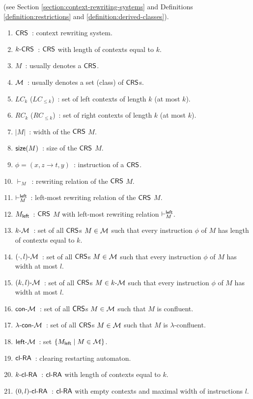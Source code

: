  (see Section \ref{section:context-rewriting-systems} and Definitions \ref{definition:restrictions} and \ref{definition:derived-classes}).

\begin{enumerate}[]
\item $\textup{\sf CRS\/}$\ : context rewriting system.
\item $\textup{\sf $k$-\textup{\sf CRS\/}}$\ : $\textup{\sf CRS\/}$ with length of contexts equal to $k$.
\item $M$\ : usually denotes a $\textup{\sf CRS\/}$.
\item $\textup{\sf $\mathcal{M}$}$\ : usually denotes a set (class) of $\textup{\sf CRS\/}$s.
\item $LC_k$ ($LC_{\le k}$)\ : set of left contexts of length $k$ (at most $k$).
\item $RC_k$ ($RC_{\le k}$)\ : set of right contexts of length $k$ (at most $k$).
\item $|M|$\ : width of the $\textup{\sf CRS\/}$ $M$.
\item $\textup{\sf size}(M)$\ : size of the $\textup{\sf CRS\/}$ $M$.
\item $\phi = (x, z \to t, y)$\ : instruction of a $\textup{\sf CRS\/}$.
\item $\vdash_M$\ : rewriting relation of the $\textup{\sf CRS\/}$ $M$.
\item $\vdash^{\sf left}_M$\ : left-most rewriting relation of the $\textup{\sf CRS\/}$ $M$.
\item $M_{\sf left}$\ : $\textup{\sf CRS\/}$ $M$ with left-most rewriting relation $\vdash^{\sf left}_M$.
\item $\textup{\sf $k$-\textup{\sf $\mathcal{M}$}}$\ : set of all $\textup{\sf CRS\/}$s $M \in \textup{\sf $\mathcal{M}$}$ such that every instruction $\phi$ of $M$ has length of contexts equal to $k$.
\item $\textup{\sf $(\cdot,l)$-\textup{\sf $\mathcal{M}$}}$\ : set of all $\textup{\sf CRS\/}$s $M \in \textup{\sf $\mathcal{M}$}$ such that every instruction $\phi$ of $M$ has width at most $l$.
\item $\textup{\sf $(k,l)$-\textup{\sf $\mathcal{M}$}}$\ : set of all $\textup{\sf CRS\/}$s $M \in \textup{\sf $k$-\textup{\sf $\mathcal{M}$}}$ such that every instruction $\phi$ of $M$ has width at most $l$.
\item $\textup{\sf con-\textup{\sf $\mathcal{M}$}}$\ : set of all $\textup{\sf CRS\/}$s $M \in \textup{\sf $\mathcal{M}$}$ such that $M$ is confluent.
\item $\textup{\sf $\lambda$-con-\textup{\sf $\mathcal{M}$}}$\ : set of all $\textup{\sf CRS\/}$s $M \in \textup{\sf $\mathcal{M}$}$ such that $M$ is $\lambda$-confluent.
\item $\textup{\sf left-\textup{\sf $\mathcal{M}$}}$\ : set $\{M_{\sf left} \mid M \in \textup{\sf $\mathcal{M}$}\}$.
\item $\textup{\sf cl-RA\/}$\ : clearing restarting automaton.
\item $\textup{\sf $k$-\textup{\sf cl-RA\/}}$\ : $\textup{\sf cl-RA\/}$ with length of contexts equal to $k$.
\item $\textup{\sf $(0,l)$-\textup{\sf cl-RA\/}}$\ : $\textup{\sf cl-RA\/}$ with empty contexts and maximal width of instructions $l$.

\end{enumerate}
